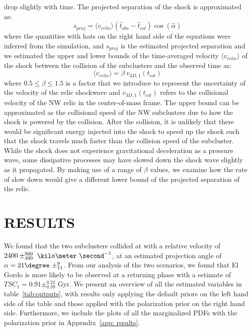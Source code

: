 drop slightly with time. 
The projected separation of the shock is approximated as:
\begin{equation}
	s_{proj} = \langle v_{relic} \rangle (\hat{t}_{obs} - \hat{t}_{col}) \cos(\hat{\alpha})
	\label{eqn: projectedsep}
\end{equation}
where the quantities with hats on the right hand side of the equations were
inferred from the simulation, and $s_{proj}$ is the estimated projected separation and we estimated the
upper and lower bounds of the time-averaged velocity
$\langle v_{relic} \rangle$ of the shock between
the collision of the subclusters and the observed time as:  
\begin{equation}
	\langle v_{relic} \rangle = \beta~v_{3D,1}(t_{col})  
\end{equation}
where $0.5 \leq \beta \leq 1.5$ is a factor that we introduce to represent the
uncertainty of the velocity of the relic shockwave and $v_{3D,1}(t_{col})$ refers to the collisional velocity of
the NW relic in the center-of-mass frame. The upper bound can be
approximated as the collisional speed of the NW subclusters due to how the
shock is powered by the collision. After the collision, it is unlikely that
there would be significant energy injected into the shock to speed up the
shock such that the shock travels much faster than the collision speed of the subcluster. While the shock does not experience gravitational deceleration as a
pressure wave, some dissipative processes may have slowed down the shock
wave slightly as it propagated. By making use of a
range of $\beta$ values, we examine how the rate of slow down would
give a different lower bound of the projected separation of the relic.   
\par      

%


\section{RESULTS} 
We found that the two subclusters collided at with a relative velocity of 
$2400\pm^{900}_{400}~\kilo\meter~\second^{-1}$, at an estimated projection
angle of $\alpha = 21\degree~\pm^{9}_{11}$. From our analysis of the two
scenarios, we found that El Gordo is more likely to be observed at a returning
phase with a estimate of $TSC_1 = 0.91\pm^{0.22}_{0.39}$ Gyr. We present an
overview of all the estimated variables in table~\ref{tab:outputs}, with
results only applying the default priors on the left hand side of the table
and those applied with the polarization prior on the right hand side.
Furthermore, we include the plots of all the marginalized PDFs with the
polarization prior in Appendix~\ref{app: results}.  

